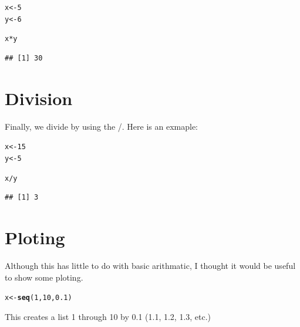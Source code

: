 \documentclass{article}\usepackage[]{graphicx}\usepackage[]{color}
\makeatletter
\newcommand{\hlnum}[1]{\textcolor[rgb]{0.686,0.059,0.569}{#1}}%
\newcommand{\hlopt}[1]{\textcolor[rgb]{0,0,0}{#1}}%
\newcommand{\hlstd}[1]{\textcolor[rgb]{0.345,0.345,0.345}{#1}}%
\newcommand{\hlkwb}[1]{\textcolor[rgb]{0.69,0.353,0.396}{#1}}%
\newcommand{\hlkwd}[1]{\textcolor[rgb]{0.737,0.353,0.396}{\textbf{#1}}}%
\newenvironment{kframe}{%
 \def\at@end@of@kframe{}%
 \ifinner\ifhmode%
  \def\at@end@of@kframe{\end{minipage}}%
  \begin{minipage}{\columnwidth}%
 \fi\fi%
 \def\FrameCommand##1{\hskip\@totalleftmargin \hskip-\fboxsep
 \colorbox{shadecolor}{##1}\hskip-\fboxsep
     \hskip-\linewidth \hskip-\@totalleftmargin \hskip\columnwidth}%
 \MakeFramed {\advance\hsize-\width
   \@totalleftmargin\z@ \linewidth\hsize
   \@setminipage}}%
 {\par\unskip\endMakeFramed%
 \at@end@of@kframe}
\newenvironment{knitrout}{}{} %
\makeatother
\begin{document}
\begin{knitrout}
\color{fgcolor}\begin{kframe}
\begin{alltt}
\hlstd{x} \hlkwb{<-} \hlnum{5}
\hlstd{y} \hlkwb{<-} \hlnum{6}

\hlstd{x}\hlopt{*}\hlstd{y}
\end{alltt}
\begin{verbatim}
## [1] 30
\end{verbatim}
\end{kframe}
\end{knitrout}

\section{Division}
Finally,  we divide by using the /. Here is an exmaple:

\begin{knitrout}
\color{fgcolor}\begin{kframe}
\begin{alltt}
\hlstd{x} \hlkwb{<-} \hlnum{15}
\hlstd{y} \hlkwb{<-} \hlnum{5}

\hlstd{x}\hlopt{/}\hlstd{y}
\end{alltt}
\begin{verbatim}
## [1] 3
\end{verbatim}
\end{kframe}
\end{knitrout}

\section{Ploting}
Although this has little to do with basic arithmatic, I thought it would be useful to show some ploting.

\begin{knitrout}
\color{fgcolor}\begin{kframe}
\begin{alltt}
\hlstd{x} \hlkwb{<-} \hlkwd{seq}\hlstd{(}\hlnum{1}\hlstd{,} \hlnum{10}\hlstd{,} \hlnum{0.1}\hlstd{)}
\end{alltt}
\end{kframe}
\end{knitrout}

\noindent This creates a list 1 through 10 by 0.1 (1.1, 1.2, 1.3, etc.)
\end{document}
